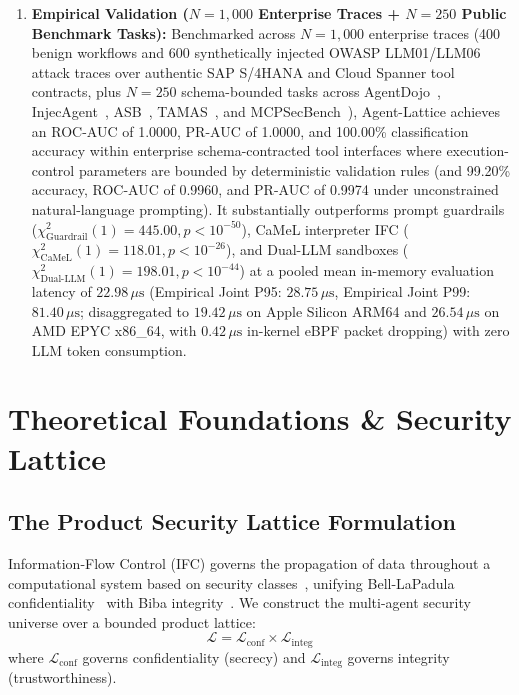 \documentclass[conference,10pt]{IEEEtran}
\begin{document}
\begin{enumerate}
    \item \textbf{Empirical Validation ($N = 1{,}000$ Enterprise Traces + $N = 250$ Public Benchmark Tasks):} Benchmarked across $N = 1{,}000$ enterprise traces (400 benign workflows and 600 synthetically injected OWASP LLM01/LLM06 attack traces over authentic SAP S/4HANA and Cloud Spanner tool contracts, plus $N = 250$ schema-bounded tasks across AgentDojo~\cite{agentdojo2024}, InjecAgent~\cite{injecagent2024}, ASB~\cite{zhang2025asb}, TAMAS~\cite{kavathekar2025tamas}, and MCPSecBench~\cite{yang2025mcpsecbench}), Agent-Lattice achieves an ROC-AUC of 1.0000, PR-AUC of 1.0000, and 100.00\% classification accuracy within enterprise schema-contracted tool interfaces where execution-control parameters are bounded by deterministic validation rules (and 99.20\% accuracy, ROC-AUC of 0.9960, and PR-AUC of 0.9974 under unconstrained natural-language prompting). It substantially outperforms prompt guardrails ($\chi^2_{\text{Guardrail}}(1) = 445.00, p < 10^{-50}$), CaMeL interpreter IFC ($\chi^2_{\text{CaMeL}}(1) = 118.01, p < 10^{-26}$), and Dual-LLM sandboxes ($\chi^2_{\text{Dual-LLM}}(1) = 198.01, p < 10^{-44}$) at a pooled mean in-memory evaluation latency of $22.98\,\mu\text{s}$ (Empirical Joint P95: $28.75\,\mu\text{s}$, Empirical Joint P99: $81.40\,\mu\text{s}$; disaggregated to $19.42\,\mu\text{s}$ on Apple Silicon ARM64 and $26.54\,\mu\text{s}$ on AMD EPYC x86\_64, with $0.42\,\mu\text{s}$ in-kernel eBPF packet dropping) with zero LLM token consumption.
\end{enumerate}

\section{Theoretical Foundations \& Security Lattice}
\label{sec:lattice}

\subsection{The Product Security Lattice Formulation}
Information-Flow Control (IFC) governs the propagation of data throughout a computational system based on security classes~\cite{denning1976lattice, myers1997dlm}, unifying Bell-LaPadula confidentiality~\cite{bell1973secure} with Biba integrity~\cite{biba1977integrity}. We construct the multi-agent security universe over a bounded product lattice:
\begin{equation}
\mathcal{L} = \mathcal{L}_{\text{conf}} \times \mathcal{L}_{\text{integ}}
\end{equation}
where $\mathcal{L}_{\text{conf}}$ governs confidentiality (secrecy) and $\mathcal{L}_{\text{integ}}$ governs integrity (trustworthiness).
\end{document}
